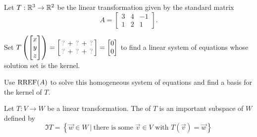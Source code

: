\begin{applicationActivities}
\begin{activity}{10}
Let $T: \mathbb{R}^3 \rightarrow \mathbb{R}^2$ be the linear transformation given by the
standard matrix
\[A=\begin{bmatrix} 3 & 4 & -1 \\ 1 & 2 & 1 \end{bmatrix}.\]
\begin{subactivity}
Set
\(
  T\left(\begin{bmatrix}x\\y\\z\end{bmatrix}\right)
    =
  \begin{bmatrix}
    \unknown+\unknown+\unknown \\
    \unknown+\unknown+\unknown
  \end{bmatrix}
    =
  \begin{bmatrix}0\\0\end{bmatrix}
\) to find a linear system of equations whose solution set is the kernel.
\end{subactivity}
\begin{subactivity}
Use $\operatorname{RREF}(A)$ to solve this homogeneous system of equations and find a basis
for the kernel of \(T\).
\end{subactivity}
\end{activity}


\begin{definition}
Let $T: V \rightarrow W$ be a linear transformation.
The  of $T$ is an important subspace of \(W\) defined by
\[
\Im T = \left\{ \vec{w} \in W\ \big|\ \text{there is some }\vec v\in V \text{ with } T(\vec{v})=\vec{w}\right\}
\]
\end{definition}


\end{applicationActivities}
